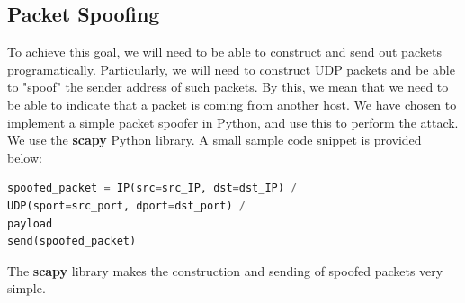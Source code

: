 \documentclass[conference]{IEEEtran}
\begin{document}
\subsection{Packet Spoofing}
To achieve this goal, we will need to be able to construct and send out packets programatically.
Particularly, we will need to construct UDP packets and be able to "spoof" the sender address of such packets.
By this, we mean that we need to be able to indicate that a packet is coming from another host.
We have chosen to implement a simple packet spoofer in Python, and use this to perform the attack.
We use the \textbf{scapy} Python library.
A small sample code snippet is provided below:
\vspace{0.3cm}
\begin{lstlisting}[language=Python]
spoofed_packet = IP(src=src_IP, dst=dst_IP) / 
UDP(sport=src_port, dport=dst_port) / 
payload
send(spoofed_packet)
\end{lstlisting}
\vspace{0.3cm}
The \textbf{scapy} library makes the construction and sending of spoofed packets very simple.
\end{document}
